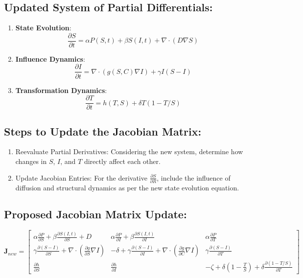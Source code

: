 \documentclass{article}
\begin{document}
\subsection{Updated System of Partial Differentials:}
\begin{enumerate}
  \item \textbf{State Evolution}:
  \[
  \frac{\partial S}{\partial t} = \alpha P(S, t) + \beta S(I, t) + \nabla \cdot (D \nabla S)
  \]
  \item \textbf{Influence Dynamics}:
  \[
  \frac{\partial I}{\partial t} = \nabla \cdot (g(S, C) \nabla I) + \gamma I(S - I)
  \]
  \item \textbf{Transformation Dynamics}:
  \[
  \frac{\partial T}{\partial t} = h(T, S) + \delta T(1 - T/S)
  \]
\end{enumerate}

\subsection{Steps to Update the Jacobian Matrix:}
\begin{enumerate}
  \item Reevaluate Partial Derivatives: Considering the new system, determine how changes in \(S\), \(I\), and \(T\) directly affect each other.
  \item Update Jacobian Entries: For the derivative \(\frac{\partial S}{\partial R}\), include the influence of diffusion and structural dynamics as per the new state evolution equation.
\end{enumerate}

\subsection{Proposed Jacobian Matrix Update:}
\[
\mathbf{J}_{new} = \begin{bmatrix}
\alpha \frac{\partial P}{\partial S} + \beta \frac{\partial S(I, t)}{\partial S} + D & \alpha \frac{\partial P}{\partial I} + \beta \frac{\partial S(I, t)}{\partial I} & \alpha \frac{\partial P}{\partial T} \\
\gamma \frac{\partial (S - I)}{\partial S} + \nabla \cdot (\frac{\partial g}{\partial S} \nabla I) & -\delta + \gamma \frac{\partial (S - I)}{\partial I} + \nabla \cdot (\frac{\partial g}{\partial C} \nabla I) & \gamma \frac{\partial (S - I)}{\partial T} \\
\frac{\partial h}{\partial S} & \frac{\partial h}{\partial I} & -\zeta + \delta \left(1 - \frac{T}{S}\right) + \delta \frac{\partial (1 - T/S)}{\partial T}
\end{bmatrix}
\]
\end{document}
